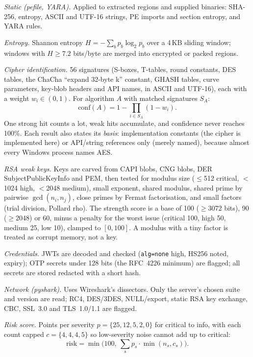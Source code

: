 \textit{Static (pefile, YARA).} Applied to extracted regions and supplied binaries: SHA-256, entropy,
ASCII and UTF-16 strings, PE imports and section entropy, and YARA rules.

\textit{Entropy.} Shannon entropy $H=-\sum_b p_b\log_2 p_b$ over a 4\,KB sliding window; windows with
$H\ge7.2$ bits/byte are merged into encrypted or packed regions.

\textit{Cipher identification.} 56 signatures (S-boxes, T-tables, round constants, DES tables, the ChaCha
``expand 32-byte k'' constant, GHASH tables, curve parameters, key-blob headers and API names, in ASCII
and UTF-16), each with a weight $w_i\in(0,1)$. For algorithm $A$ with matched signatures $S_A$:
\begin{equation}
  \mathrm{conf}(A) = 1 - \prod_{i\in S_A}(1-w_i).
\end{equation}
One strong hit counts a lot, weak hits accumulate, and confidence never reaches 100\%. Each result also
states its \emph{basis}: implementation constants (the cipher is implemented here) or API/string references
only (merely named), because almost every Windows process names AES.

\textit{RSA weak keys.} Keys are carved from CAPI blobs, CNG blobs, DER SubjectPublicKeyInfo and PEM, then
tested for modulus size ($\le$512 critical, $<$1024 high, $<$2048 medium), small exponent, shared modulus,
shared prime by pairwise $\gcd(n_i,n_j)$, close primes by Fermat factorisation, and small factors (trial
division, Pollard rho). The strength score is a base of 100 ($\ge$3072 bits), 90 ($\ge$2048) or 60, minus a
penalty for the worst issue (critical 100, high 50, medium 25, low 10), clamped to $[0,100]$. A modulus with a
tiny factor is treated as corrupt memory, not a key.

\textit{Credentials.} JWTs are decoded and checked (\texttt{alg=none} high, HS256 noted, expiry);
OTP secrets under 128 bits (the RFC~4226 minimum) are flagged; all secrets are stored redacted with a short hash.

\textit{Network (pyshark).} Uses Wireshark's dissectors. Only the server's chosen suite and version are
read; RC4, DES/3DES, NULL/export, static RSA key exchange, CBC, SSL~3.0 and TLS~1.0/1.1 are flagged.

\textit{Risk score.} Points per severity $p=\{25,12,5,2,0\}$ for critical to info, with each count capped
$c=\{4,4,4,5\}$ so low-severity noise cannot add up to critical:
\begin{equation}
  \mathrm{risk} = \min\Big(100,\ \sum_{s} p_s\cdot\min(n_s, c_s)\Big).
\end{equation}

